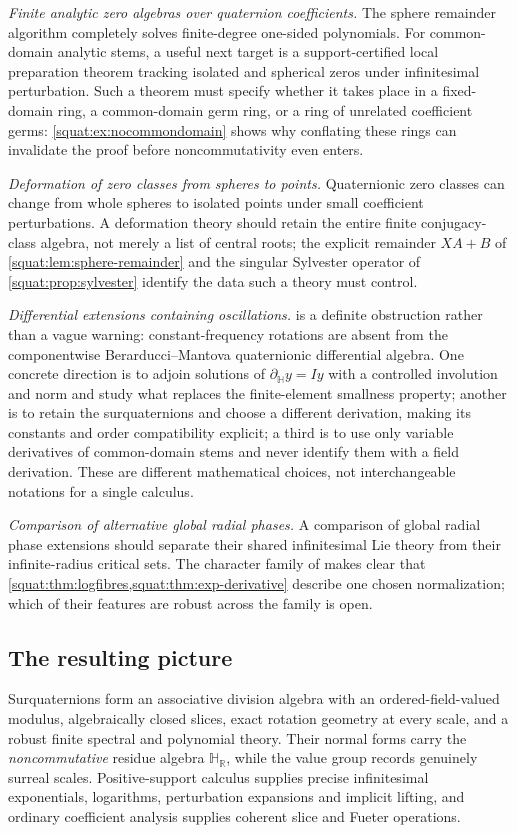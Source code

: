 \documentclass[11pt,letterpaper]{article}
\numberwithin{equation}{section}
\theoremstyle{definition}
\theoremstyle{remark}
\newcommand{\HR}{\mathbb H_{\mathbb R}}
\newcommand{\dH}{\partial_{\mathbb H}}
\begin{document}
\emph{Finite analytic zero algebras over quaternion coefficients.} The sphere remainder
algorithm completely solves finite-degree one-sided polynomials. For common-domain analytic
stems, a useful next target is a support-certified local preparation theorem tracking
isolated and spherical zeros under infinitesimal perturbation. Such a theorem must specify
whether it takes place in a fixed-domain ring, a common-domain germ ring, or a ring of
unrelated coefficient germs: \cref{squat:ex:nocommondomain} shows why conflating these
rings can invalidate the proof before noncommutativity even enters.

\emph{Deformation of zero classes from spheres to points.} Quaternionic zero classes can
change from whole spheres to isolated points under small coefficient perturbations. A
deformation theory should retain the entire finite conjugacy-class algebra, not merely a
list of central roots; the explicit remainder $XA+B$ of
\cref{squat:lem:sphere-remainder} and the singular Sylvester operator of
\cref{squat:prop:sylvester} identify the data such a theory must control.

\emph{Differential extensions containing oscillations.}
 is a definite obstruction rather than a vague warning:
constant-frequency rotations are absent from the componentwise Berarducci--Mantova
quaternionic differential algebra. One concrete direction is to adjoin solutions of
$\dH y=Iy$ with a controlled involution and norm and study what replaces the finite-element
smallness property; another is to retain the surquaternions and choose a different
derivation, making its constants and order compatibility explicit; a third is to use only
variable derivatives of common-domain stems and never identify them with a field
derivation. These are different mathematical choices, not interchangeable notations for a
single calculus.

\emph{Comparison of alternative global radial phases.} A comparison of global radial phase
extensions should separate their shared infinitesimal Lie theory from their infinite-radius
critical sets. The character family of \cite{RepoTrig,EK} makes clear that
\cref{squat:thm:logfibres,squat:thm:exp-derivative} describe one chosen normalization;
which of their features are robust across the family is open.

\subsection{The resulting picture}\label{squat:sub:synthesis}
Surquaternions form an associative division algebra with an ordered-field-valued modulus,
algebraically closed slices, exact rotation geometry at every scale, and a robust finite
spectral and polynomial theory. Their normal forms carry the \emph{noncommutative} residue
algebra $\HR$, while the value group records genuinely surreal scales. Positive-support
calculus supplies precise infinitesimal exponentials, logarithms, perturbation expansions
and implicit lifting, and ordinary coefficient analysis supplies coherent slice and Fueter
operations.
\end{document}
